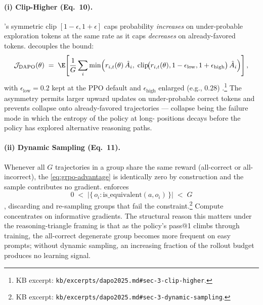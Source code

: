 \paragraph{(i) Clip-Higher (Eq.\ 10).} 's symmetric clip
$[1 - \epsilon, 1 + \epsilon]$ caps probability \emph{increases} on
under-probable exploration tokens at the same rate as it caps
\emph{decreases} on already-favored tokens.  decouples the bound:
\begin{equation}
\mathcal{J}_{\mathrm{DAPO}}(\theta) \;=\; \E\!\left[\frac{1}{G} \sum_i \min\!\Big( r_{i,t}(\theta)\, \hat{A}_i,\; \mathrm{clip}\!\big(r_{i,t}(\theta), 1 - \epsilon_{\mathrm{low}}, 1 + \epsilon_{\mathrm{high}}\big)\, \hat{A}_i \Big) \right],
\label{eq:dapo-clip}
\end{equation}
with $\epsilon_{\mathrm{low}} = 0.2$ kept at the PPO default and
$\epsilon_{\mathrm{high}}$ enlarged (e.g., $0.28$) \citep[Eq.\
10]{dapo2025}.\footnote{KB excerpt:
\nolinkurl{kb/excerpts/dapo2025.md#sec-3-clip-higher}.} The asymmetry
permits larger upward updates on under-probable correct tokens and
prevents collapse onto already-favored trajectories --- collapse being
the failure mode in which the entropy of the policy at long-
positions decays before the policy has explored alternative reasoning
paths.

\paragraph{(ii) Dynamic Sampling (Eq.\ 11).} Whenever all $G$
trajectories in a group share the same reward (all-correct or
all-incorrect), the  \cref{eq:grpo-advantage}
is identically zero by construction and the sample contributes no
gradient. \glsterm{dapo-2}{DAPO} enforces
\begin{equation}
0 \;<\; \big| \{\, o_i : \mathrm{is\_equivalent}(a, o_i) \,\}\big| \;<\; G
\label{eq:dapo-dynsample}
\end{equation}
\citep[Eq.\ 11]{dapo2025}, discarding and re-sampling groups that fail
the constraint.\footnote{KB excerpt:
\nolinkurl{kb/excerpts/dapo2025.md#sec-3-dynamic-sampling}.} Compute
concentrates on informative gradients. The structural reason this
matters under the reasoning-triangle framing is that as the policy's
pass@1 climbs through training, the all-correct degenerate group
becomes more frequent on easy prompts; without dynamic sampling, an
increasing fraction of the rollout budget produces no learning signal.


